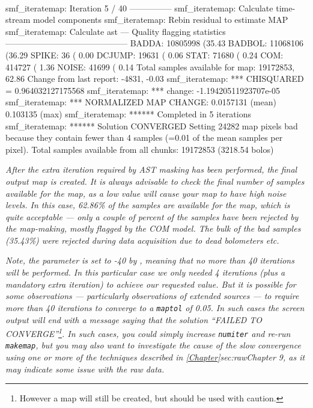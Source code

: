 \begin{terminalv}
~
\begin{terminalv}
smf_iteratemap: Iteration 5 / 40 ---------------
smf_iteratemap: Calculate time-stream model components
smf_iteratemap: Rebin residual to estimate MAP
smf_iteratemap: Calculate ast
--- Quality flagging statistics --------------------------------------------
 BADDA:   10805998 (35.43%
BADBOL:   11068106 (36.29%
 SPIKE:         36 ( 0.00%
DCJUMP:      19631 ( 0.06%
  STAT:      71680 ( 0.24%
   COM:     414727 ( 1.36%
 NOISE:      41699 ( 0.14%
Total samples available for map:   19172853, 62.86%
     Change from last report:      -4831, -0.03%
smf_iteratemap: *** CHISQUARED = 0.964032127175568
smf_iteratemap: *** change: -1.19420511923707e-05
smf_iteratemap: *** NORMALIZED MAP CHANGE: 0.0157131 (mean) 0.103135 (max)
smf_iteratemap: ****** Completed in 5 iterations
smf_iteratemap: ****** Solution CONVERGED
Setting 24282 map pixels bad because they contain fewer than 4 samples (=0.01
of the mean samples per pixel).
Total samples available from all chunks: 19172853 (3218.54 bolos)
\end{terminalv}

\emph{After the extra iteration required by AST masking has been
performed, the final output map is created. It is always advisable to
check the final number of samples available for the map, as a low value
will cause your map to have high noise levels. In this case, 62.86\% of
the samples are available for the map, which is quite acceptable --- only
a couple of percent of the samples have been rejected by the map-making,
mostly flagged by the COM model. The bulk of the bad samples (35.43\%)
were rejected during data acquisition due to dead bolometers \emph{etc}.}

\emph{Note, the  parameter is set to -40 by
\brightcompact, meaning that no more than 40 iterations will be
performed. In this particular case we only needed 4 iterations (plus a
mandatory extra iteration) to achieve
our requested  value. But it is possible for some
observations --- particularly observations of extended sources --- to
require more than 40 iterations to converge to a \texttt{maptol} of 0.05.
In such cases the screen output will end with a message saying that the
solution ``FAILED TO CONVERGE''\footnote{However a map will still be
created, but should be used with caution.}. In such cases, you \emph{could}
simply increase \texttt{numiter} and re-run \texttt{makemap}, but you may
also want to investigate the cause of the slow convergence using one or more
of the techniques described in \cref{Chapter}{sec:raw}{Chapter 9}, as it
may indicate some issue with the raw data.}


\end{terminalv}
